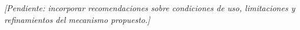 \textit{[Pendiente: incorporar recomendaciones sobre condiciones de uso, limitaciones y refinamientos del mecanismo propuesto.]}